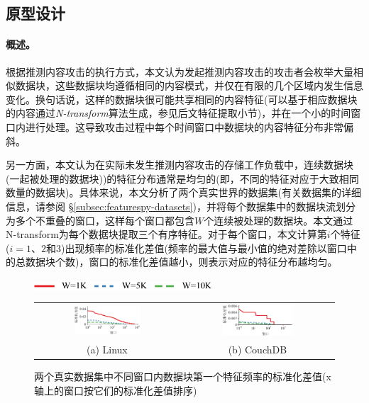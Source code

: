 \subsection{原型设计}
\label{subsec:featurespy-basic}

\paragraph*{概述。}

根据推测内容攻击的执行方式，本文认为发起推测内容攻击的攻击者会枚举大量相似数据块，这些数据块均遵循相同的内容模式，并仅在有限的几个区域内发生信息变化。换句话说，这样的数据块很可能共享相同的内容特征(可以基于相应数据块的内容通过\textit{N-transform}算法生成，参见后文特征提取小节)，并在一个小的时间窗口内进行处理。这导致攻击过程中每个时间窗口中数据块的内容特征分布非常偏斜。

另一方面，本文认为在实际未发生推测内容攻击的存储工作负载中，连续数据块(一起被处理的数据块))的特征分布通常是均匀的(即，不同的特征对应于大致相同数量的数据块)。具体来说，本文分析了两个真实世界的数据集(有关数据集的详细信息，请参阅 \S\ref{subsec:featurespy-datasets})，并将每个数据集中的数据块流划分为多个不重叠的窗口，这样每个窗口都包含$W$个连续被处理的数据块。本文通过N-transform为每个数据块提取三个有序特征。对于每个窗口，本文计算第$i$个特征($i=1$、$2$和$3$)出现频率的标准化差值(频率的最大值与最小值的绝对差除以窗口中的总数据块个数)，窗口的标准化差值越小，则表示对应的特征分布越均匀。

\begin{figure}[!htb]
  \centering
  \includegraphics[height=3mm]{pic/featurespy/plot/featureDistribution/featureDistributionLegend.pdf}
  \begin{tabular}{cc}
    \includegraphics[width=0.477\textwidth]{pic/featurespy/plot/featureDistribution/featureDistributionLinux.pdf} &
    \includegraphics[width=0.477\textwidth]{pic/featurespy/plot/featureDistribution/featureDistributionCouchbase.pdf}                    \\
    {\small (a) Linux}                                                                                            & {\small (b) CouchDB} \\
  \end{tabular}
  \caption{两个真实数据集中不同窗口内数据块第一个特征频率的标准化差值(x轴上的窗口按它们的标准化差值排序)}
  \label{fig:featurespy-featureDistribution}
\end{figure}

